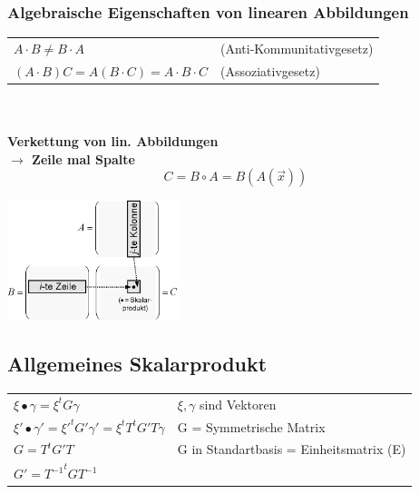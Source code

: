 	\subsubsection{Algebraische Eigenschaften von linearen Abbildungen}
		\begin{minipage}{10cm}
			\begin{tabular}{ll}
				$A \cdot B \neq B \cdot A$ & (Anti-Kommunitativgesetz)\\
				$(A \cdot B)C = A(B \cdot C) = A \cdot B \cdot C$ & (Assoziativgesetz)
			\end{tabular}\\ \\
			\textbf{Verkettung von lin. Abbildungen}\\
			\textbf{$\rightarrow$ Zeile mal Spalte}\\
				$$C=B\circ A=B(A(\vec{x}))$$
		\end{minipage}
		\begin{minipage}{7cm}
			\includegraphics[width=5cm]{pics/3_Matrizenmulti}
		\end{minipage}

\subsection{Allgemeines Skalarprodukt}
	\begin{tabular}{ll}
		$\xi \bullet  \gamma = \xi^tG\gamma$ & $\xi, \gamma$ sind Vektoren\\
		$\xi' \bullet \gamma' = {\xi'}^tG'\gamma' = \xi^tT^tG'T\gamma$ & G = Symmetrische Matrix\\
		$G = T^tG'T$ & G in Standartbasis = Einheitsmatrix (E)\\
		$G' = {T^{-1}}^tGT^{-1}$ &
	\end{tabular}





















